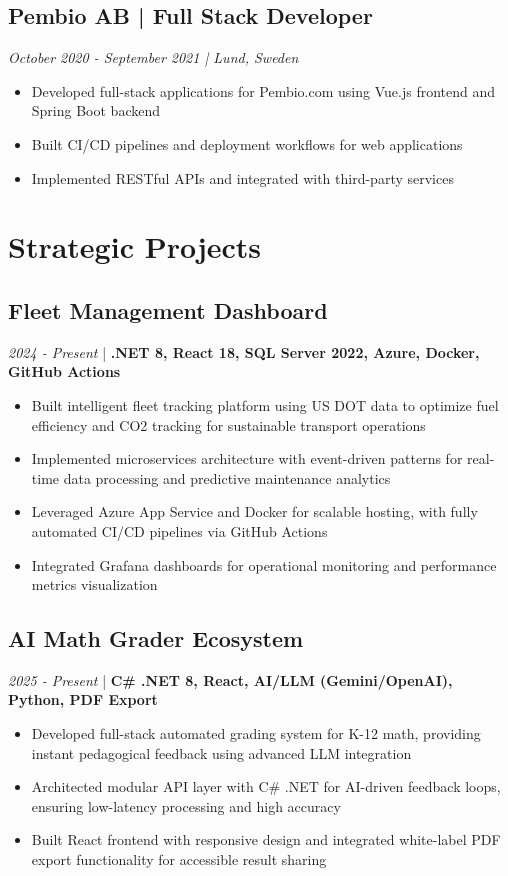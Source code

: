 \documentclass[11pt,a4paper]{article}
\begin{document}
\subsection*{Pembio AB | Full Stack Developer}
\textit{October 2020 - September 2021 | Lund, Sweden}
\begin{itemize}[noitemsep]
\item Developed full-stack applications for Pembio.com using Vue.js frontend and Spring Boot backend
\item Built CI/CD pipelines and deployment workflows for web applications
\item Implemented RESTful APIs and integrated with third-party services
\end{itemize}

\section*{Strategic Projects}

\subsection*{Fleet Management Dashboard}
\textit{2024 - Present} | \textbf{.NET 8, React 18, SQL Server 2022, Azure, Docker, GitHub Actions}
\begin{itemize}[noitemsep]
\item Built intelligent fleet tracking platform using US DOT data to optimize fuel efficiency and CO2 tracking for sustainable transport operations
\item Implemented microservices architecture with event-driven patterns for real-time data processing and predictive maintenance analytics
\item Leveraged Azure App Service and Docker for scalable hosting, with fully automated CI/CD pipelines via GitHub Actions
\item Integrated Grafana dashboards for operational monitoring and performance metrics visualization
\end{itemize}

\subsection*{AI Math Grader Ecosystem}
\textit{2025 - Present} | \textbf{C\# .NET 8, React, AI/LLM (Gemini/OpenAI), Python, PDF Export}
\begin{itemize}[noitemsep]
\item Developed full-stack automated grading system for K-12 math, providing instant pedagogical feedback using advanced LLM integration
\item Architected modular API layer with C\# .NET for AI-driven feedback loops, ensuring low-latency processing and high accuracy
\item Built React frontend with responsive design and integrated white-label PDF export functionality for accessible result sharing
\end{itemize}
\end{document}

